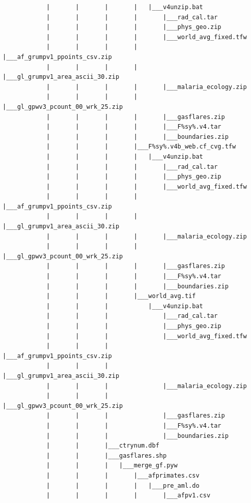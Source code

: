 \documentclass[]{book}
\begin{document}
\begin{verbatim}
            |       |       |       |   |___v4unzip.bat
            |       |       |       |       |___rad_cal.tar
            |       |       |       |       |___phys_geo.zip
            |       |       |       |       |___world_avg_fixed.tfw
            |       |       |       |       |___af_grumpv1_ppoints_csv.zip
            |       |       |       |       |___gl_grumpv1_area_ascii_30.zip
            |       |       |       |       |___malaria_ecology.zip
            |       |       |       |       |___gl_gpwv3_pcount_00_wrk_25.zip
            |       |       |       |       |___gasflares.zip
            |       |       |       |       |___F%sy%.v4.tar
            |       |       |       |       |___boundaries.zip
            |       |       |       |___F%sy%.v4b_web.cf_cvg.tfw
            |       |       |       |   |___v4unzip.bat
            |       |       |       |       |___rad_cal.tar
            |       |       |       |       |___phys_geo.zip
            |       |       |       |       |___world_avg_fixed.tfw
            |       |       |       |       |___af_grumpv1_ppoints_csv.zip
            |       |       |       |       |___gl_grumpv1_area_ascii_30.zip
            |       |       |       |       |___malaria_ecology.zip
            |       |       |       |       |___gl_gpwv3_pcount_00_wrk_25.zip
            |       |       |       |       |___gasflares.zip
            |       |       |       |       |___F%sy%.v4.tar
            |       |       |       |       |___boundaries.zip
            |       |       |       |___world_avg.tif
            |       |       |           |___v4unzip.bat
            |       |       |               |___rad_cal.tar
            |       |       |               |___phys_geo.zip
            |       |       |               |___world_avg_fixed.tfw
            |       |       |               |___af_grumpv1_ppoints_csv.zip
            |       |       |               |___gl_grumpv1_area_ascii_30.zip
            |       |       |               |___malaria_ecology.zip
            |       |       |               |___gl_gpwv3_pcount_00_wrk_25.zip
            |       |       |               |___gasflares.zip
            |       |       |               |___F%sy%.v4.tar
            |       |       |               |___boundaries.zip
            |       |       |___ctrynum.dbf
            |       |       |___gasflares.shp
            |       |       |   |___merge_gf.pyw
            |       |       |       |___afprimates.csv
            |       |       |       |   |___pre_aml.do
            |       |       |       |       |___afpv1.csv

\end{verbatim}
\end{document}
